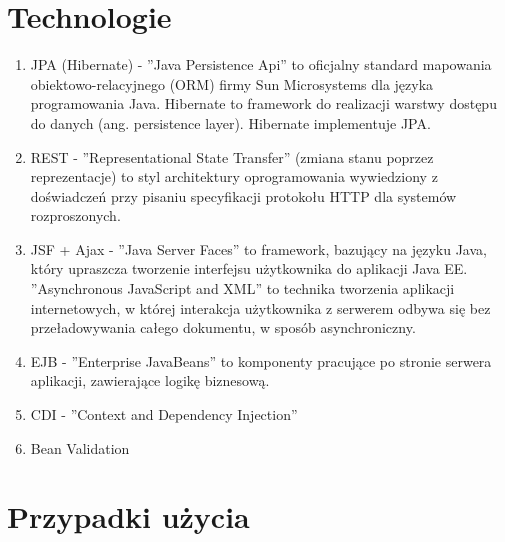 \documentclass[a4paper]{article}
\begin{document}
\section{Technologie}
\begin{enumerate}
\item JPA (Hibernate) - ''Java Persistence Api'' to oficjalny standard mapowania obiektowo-relacyjnego (ORM) firmy Sun Microsystems dla języka programowania Java. Hibernate to framework do realizacji warstwy dostępu do danych (ang. persistence layer). Hibernate implementuje JPA.
\item REST - ''Representational State Transfer'' (zmiana stanu poprzez reprezentacje) to styl architektury oprogramowania wywiedziony z doświadczeń przy pisaniu specyfikacji protokołu HTTP dla systemów rozproszonych. 
\item JSF + Ajax - ''Java Server Faces'' to framework, bazujący na języku Java, który upraszcza tworzenie interfejsu użytkownika do aplikacji Java EE. ''Asynchronous JavaScript and XML'' to technika tworzenia aplikacji internetowych, w której interakcja użytkownika z serwerem odbywa się bez przeładowywania całego dokumentu, w sposób asynchroniczny.
\item EJB - ''Enterprise JavaBeans'' to komponenty pracujące po stronie serwera aplikacji, zawierające logikę biznesową.
\item CDI - ''Context and Dependency Injection''
\item Bean Validation 
\end{enumerate}



\section{Przypadki użycia}
\end{document}
